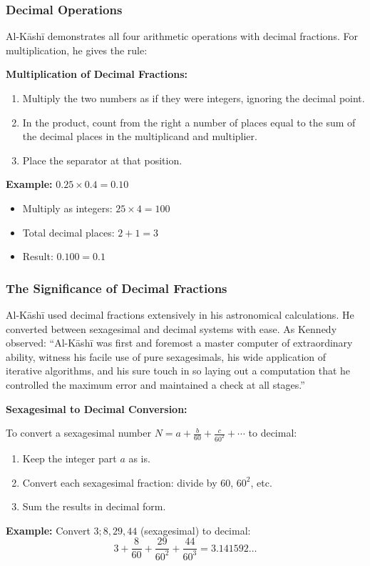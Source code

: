 \documentclass[11pt,a4paper]{article}
\newenvironment{mathalgo}{%
  \par\vspace{0.3cm}
  \begin{framed}
  \setlength{\parindent}{0pt}
}{%
  \end{framed}
  \par\vspace{0.3cm}
}
\begin{document}
\subsubsection{Decimal Operations}

Al-K\=ash\=i demonstrates all four arithmetic operations with decimal
fractions. For multiplication, he gives the rule:

\begin{mathalgo}
\textbf{Multiplication of Decimal Fractions:}
\begin{enumerate}[nosep]
  \item Multiply the two numbers as if they were integers, ignoring the
  decimal point.
  \item In the product, count from the right a number of places equal to
  the sum of the decimal places in the multiplicand and multiplier.
  \item Place the separator at that position.
\end{enumerate}

\textbf{Example:} $0.25 \times 0.4 = 0.10$
\begin{itemize}[nosep]
  \item Multiply as integers: $25 \times 4 = 100$
  \item Total decimal places: $2 + 1 = 3$
  \item Result: $0.100 = 0.1$
\end{itemize}
\end{mathalgo}

\subsubsection{The Significance of Decimal Fractions}

Al-K\=ash\=i used decimal fractions extensively in his astronomical
calculations. He converted between sexagesimal and decimal systems with
ease. As Kennedy observed: ``Al-K\=ash\=i was first and foremost a master
computer of extraordinary ability, witness his facile use of pure
sexagesimals, his wide application of iterative algorithms, and his sure
touch in so laying out a computation that he controlled the maximum error
and maintained a check at all stages.''

\begin{mathalgo}
\textbf{Sexagesimal to Decimal Conversion:}

To convert a sexagesimal number $N = a + \frac{b}{60} +
\frac{c}{60^2} + \cdots$ to decimal:
\begin{enumerate}[nosep]
  \item Keep the integer part $a$ as is.
  \item Convert each sexagesimal fraction: divide by $60$, $60^2$, etc.
  \item Sum the results in decimal form.
\end{enumerate}

\textbf{Example:} Convert $3; 8, 29, 44$ (sexagesimal) to decimal:
\[
3 + \frac{8}{60} + \frac{29}{60^2} + \frac{44}{60^3} = 3.141592\ldots
\]
\end{mathalgo}
\clearpage
\end{document}
